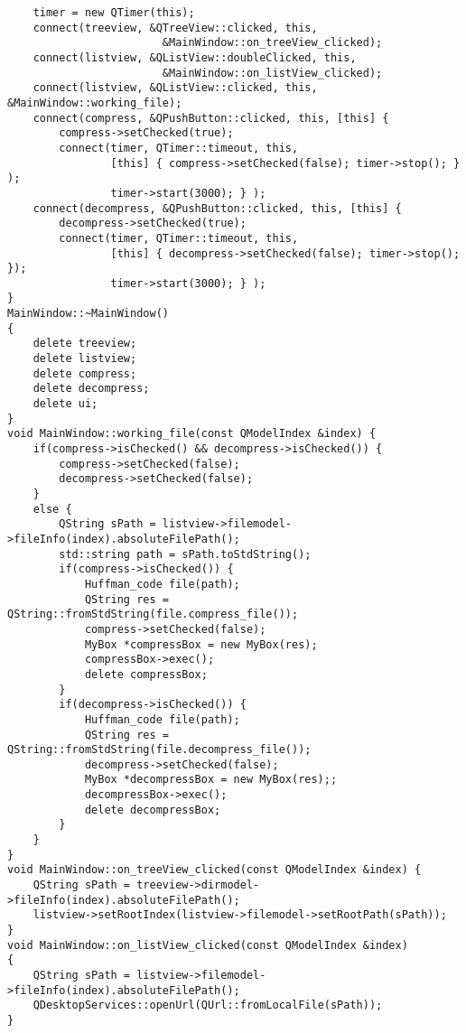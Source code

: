 \begin{verbatim}
    timer = new QTimer(this);
    connect(treeview, &QTreeView::clicked, this, 
                        &MainWindow::on_treeView_clicked);
    connect(listview, &QListView::doubleClicked, this,  
                        &MainWindow::on_listView_clicked);
    connect(listview, &QListView::clicked, this, &MainWindow::working_file);
    connect(compress, &QPushButton::clicked, this, [this] {
        compress->setChecked(true);
        connect(timer, QTimer::timeout, this,
                [this] { compress->setChecked(false); timer->stop(); } );
                timer->start(3000); } );
    connect(decompress, &QPushButton::clicked, this, [this] {
        decompress->setChecked(true);
        connect(timer, QTimer::timeout, this,
                [this] { decompress->setChecked(false); timer->stop(); });
                timer->start(3000); } );
}
MainWindow::~MainWindow()
{
    delete treeview;
    delete listview;
    delete compress;
    delete decompress;
    delete ui;
}
void MainWindow::working_file(const QModelIndex &index) {
    if(compress->isChecked() && decompress->isChecked()) {
        compress->setChecked(false);
        decompress->setChecked(false);
    }
    else {
        QString sPath = listview->filemodel->fileInfo(index).absoluteFilePath();
        std::string path = sPath.toStdString();
        if(compress->isChecked()) {
            Huffman_code file(path);
            QString res = QString::fromStdString(file.compress_file());
            compress->setChecked(false);
            MyBox *compressBox = new MyBox(res);
            compressBox->exec();
            delete compressBox;
        }
        if(decompress->isChecked()) {
            Huffman_code file(path);
            QString res = QString::fromStdString(file.decompress_file());
            decompress->setChecked(false);
            MyBox *decompressBox = new MyBox(res);;
            decompressBox->exec();
            delete decompressBox;
        }
    }
}
void MainWindow::on_treeView_clicked(const QModelIndex &index) {
    QString sPath = treeview->dirmodel->fileInfo(index).absoluteFilePath();
    listview->setRootIndex(listview->filemodel->setRootPath(sPath));
}
void MainWindow::on_listView_clicked(const QModelIndex &index)
{
    QString sPath = listview->filemodel->fileInfo(index).absoluteFilePath();
    QDesktopServices::openUrl(QUrl::fromLocalFile(sPath));
}
\end{verbatim}
